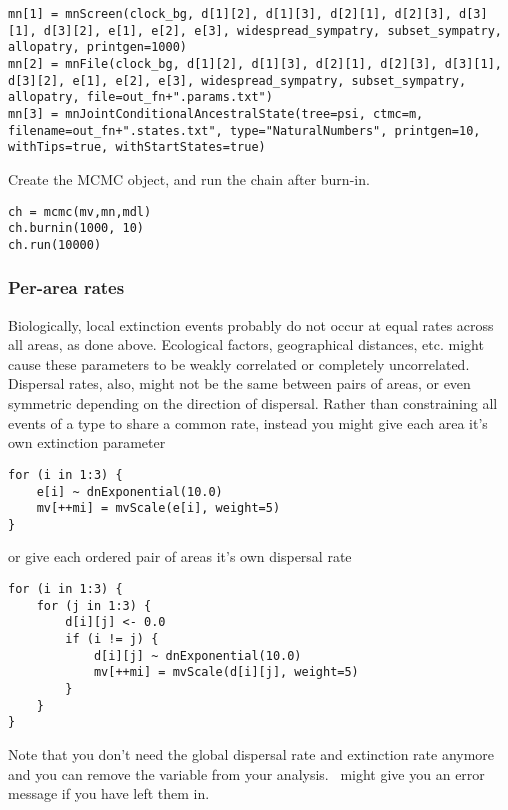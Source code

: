 \begin{snugshade}
\begin{lstlisting}
mn[1] = mnScreen(clock_bg, d[1][2], d[1][3], d[2][1], d[2][3], d[3][1], d[3][2], e[1], e[2], e[3], widespread_sympatry, subset_sympatry, allopatry, printgen=1000)
mn[2] = mnFile(clock_bg, d[1][2], d[1][3], d[2][1], d[2][3], d[3][1], d[3][2], e[1], e[2], e[3], widespread_sympatry, subset_sympatry, allopatry, file=out_fn+".params.txt")
mn[3] = mnJointConditionalAncestralState(tree=psi, ctmc=m, filename=out_fn+".states.txt", type="NaturalNumbers", printgen=10, withTips=true, withStartStates=true)
\end{lstlisting}
\end{snugshade}

Create the MCMC object, and run the chain after burn-in.
\begin{snugshade}
\begin{lstlisting}
ch = mcmc(mv,mn,mdl)
ch.burnin(1000, 10)
ch.run(10000)
\end{lstlisting}
\end{snugshade}

\subsubsection{Per-area rates}

Biologically, local extinction events probably do not occur at equal rates across all areas, as done above.
Ecological factors, geographical distances, etc. might cause these parameters to be weakly correlated or completely uncorrelated.
Dispersal rates, also, might not be the same between pairs of areas, or even symmetric depending on the direction of dispersal.
Rather than constraining all events of a type to share a common rate, instead you might give each area it's own extinction parameter

\begin{snugshade}
\begin{lstlisting}
for (i in 1:3) {
    e[i] ~ dnExponential(10.0)
    mv[++mi] = mvScale(e[i], weight=5)
}
\end{lstlisting}
\end{snugshade}

or give each ordered pair of areas it's own dispersal rate

\begin{snugshade}
\begin{lstlisting}
for (i in 1:3) {
    for (j in 1:3) {
    	d[i][j] <- 0.0
        if (i != j) {
            d[i][j] ~ dnExponential(10.0)
            mv[++mi] = mvScale(d[i][j], weight=5)
        }
    }
}
\end{lstlisting}
\end{snugshade}
Note that you don't need the global dispersal rate  and extinction rate  anymore and you can remove the variable from your analysis. \RevBayes~might give you an error message if you have left them in.

